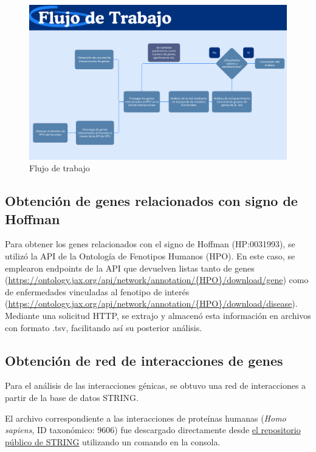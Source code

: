 \begin{figure}[h!]
	\includegraphics[width=.95\textwidth]{figures/workflow.png}
	\caption{Flujo de trabajo}
	\label{fig:workflow}
\end{figure}

\subsection{Obtención de genes relacionados con signo de Hoffman}

Para obtener los genes relacionados con el signo de Hoffman (HP:0031993), se utilizó la API de la Ontología de Fenotipos Humanos (HPO). En este caso, se emplearon endpoints de la API que devuelven listas tanto de genes (\url{https://ontology.jax.org/api/network/annotation/{HPO}/download/gene}) como de enfermedades vinculadas al fenotipo de interés (\url{https://ontology.jax.org/api/network/annotation/{HPO}/download/disease}). Mediante una solicitud HTTP, se extrajo y almacenó esta información en archivos con formato .tsv, facilitando así su posterior análisis. 


\subsection{Obtención de red de interacciones de genes}

Para el análisis de las interacciones génicas, se obtuvo una red de interacciones a partir de la base de datos STRING.

El archivo correspondiente a las interacciones de proteínas humanas (\textit{Homo sapiens}, ID taxonómico: 9606) fue descargado directamente desde \href{https://stringdb-downloads.org/download/protein.links.v12.0/9606.protein.links.v12.0.txt.gz}{el repositorio público de STRING} utilizando un comando en la consola.


